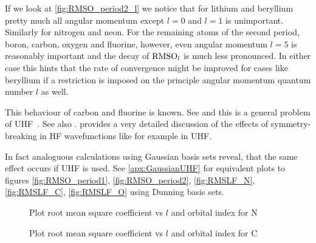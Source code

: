 If we look at \vref{fig:RMSO_period2_l} we notice
that for lithium and beryllium pretty much all angular momentum
except $l = 0$ and $l = 1$ is unimportant.
Similarly for nitrogen and neon.
For the remaining atoms of the second period,
boron, carbon, oxygen and fluorine, however,
even angular momentum $l=5$ is reasonably important and the
decay of $\text{RMSO}_l$ is much less pronounced.
In either case this hints that the rate of convergence might
be improved for cases like beryllium
if a restriction is imposed on the principle angular momentum
quantum number $l$ as well.

This behaviour of carbon and fluorine is known.
See \citet{Cook1981}
and this is a general problem of UHF~\citet{Cook1984}.
See also \citet{McWeeny1985}.
\citet{Fukutome1981} provides a very detailed discussion of the
effects of symmetry-breaking in HF wavefunctions like for example in UHF.

In fact analoguous calculations using Gaussian basis sets reveal,
that the same effect occurs if UHF is used.
See \vref{apx:GaussianUHF} for equivalent plots to figures \vref{fig:RMSO_period1},
\vref{fig:RMSO_period2},  \vref{fig:RMSLF_N}, \vref{fig:RMSLF_C}, \vref{fig:RMSLF_O}
using Dunning basis sets.





\begin{figure}
	\centering
	\caption{Plot root mean square coefficient vs $l$ and orbital index for N}
	\label{fig:RMSLF_N}
\end{figure}

\begin{figure}
	\centering
	\caption{Plot root mean square coefficient vs $l$ and orbital index for C}
	\label{fig:RMSLF_C}
\end{figure}

